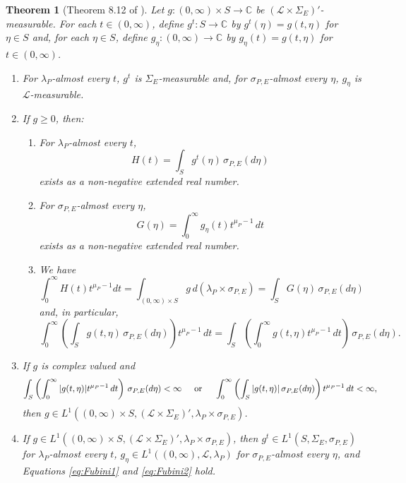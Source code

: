 \documentclass[11pt]{article}
\newtheorem{theorem}{Theorem}[section]
\begin{document}
\begin{theorem}[Theorem 8.12 of \cite{Rudin1987}]\label{thm:Fubini}
Let $g:(0,\infty)\times S\to\mathbb{C}$ be $(\mathcal{L}\times\Sigma_E)'$-measurable. For each $t\in (0,\infty)$, define $g^t:S\to\mathbb{C}$ by $g^t(\eta)=g(t,\eta)$ for $\eta\in S$ and, for each $\eta\in S$, define $g_\eta:(0,\infty)\to\mathbb{C}$ by $g_\eta(t)=g(t,\eta)$ for $t\in (0,\infty)$. 
\begin{enumerate}
\item For $\lambda_P$-almost every $t$, $g^t$ is $\Sigma_E$-measurable and, for $\sigma_{P,E}$-almost every $\eta$, $g_\eta$ is $\mathcal{L}$-measurable.
\item\label{item:Fubini1} If $g\geq 0$, then:
\begin{enumerate}
\item For $\lambda_P$-almost every $t$, 
\begin{equation*}
H(t)=\int_S g^t(\eta)\,\sigma_{P,E}(d\eta)
\end{equation*}
exists as a non-negative extended real number. 
\item For $\sigma_{P,E}$-almost every $\eta$,
\begin{equation*}
G(\eta)=\int_0^\infty g_\eta(t)t^{\mu_P-1}\,dt
\end{equation*}
exists as a non-negative extended real number. 
\item We have
\begin{equation}\label{eq:Fubini1}
\int_0^\infty H(t)t^{\mu_P-1}dt=\int_{(0,\infty)\times S}g\,d(\lambda_P\times\sigma_{P,E})=\int_S G(\eta)\,\sigma_{P,E}(d\eta)
\end{equation}
and, in particular,
\begin{equation}\label{eq:Fubini2}
\int_0^\infty\left(\int_S g(t,\eta)\,\sigma_{P,E}(d\eta)\right)t^{\mu_P-1}\,dt=\int_S\left(\int_0^\infty g(t,\eta)t^{\mu_P-1}\,dt\right)\,\sigma_{P,E}(d\eta).
\end{equation}
\end{enumerate}
\item\label{item:Fubini2} If $g$ is complex valued and
\begin{equation*}
\int_S\left(\int_0^\infty |g(t,\eta)|t^{\mu_P-1}\,dt\right)\,\sigma_{P,E}(d\eta)<\infty\hspace{.5cm}\mbox{or}\hspace{.5cm}\int_0^\infty\left(\int_S|g(t,\eta)|\,\sigma_{P,E}(d\eta)\right)t^{\mu_P-1}\,dt<\infty,
\end{equation*}
then $g\in L^1((0,\infty)\times S,(\mathcal{L}\times\Sigma_E)',\lambda_P\times\sigma_{P,E})$.
\item If $g\in L^1((0,\infty)\times S,(\mathcal{L}\times\Sigma_E)',\lambda_P\times\sigma_{P,E})$, then $g^t\in L^1(S,\Sigma_E,\sigma_{P,E})$ for $\lambda_P$-almost every $t$, $g_\eta\in L^1((0,\infty),\mathcal{L},\lambda_P)$ for $\sigma_{P,E}$-almost every $\eta$, and Equations \eqref{eq:Fubini1} and \eqref{eq:Fubini2} hold.
\end{enumerate}
\end{theorem}
\end{document}
